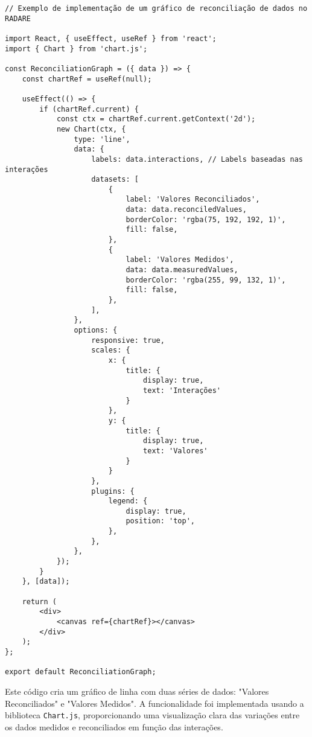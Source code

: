 \begin{verbatim}
// Exemplo de implementação de um gráfico de reconciliação de dados no RADARE

import React, { useEffect, useRef } from 'react';
import { Chart } from 'chart.js';

const ReconciliationGraph = ({ data }) => {
    const chartRef = useRef(null);

    useEffect(() => {
        if (chartRef.current) {
            const ctx = chartRef.current.getContext('2d');
            new Chart(ctx, {
                type: 'line',
                data: {
                    labels: data.interactions, // Labels baseadas nas interações
                    datasets: [
                        {
                            label: 'Valores Reconciliados',
                            data: data.reconciledValues,
                            borderColor: 'rgba(75, 192, 192, 1)',
                            fill: false,
                        },
                        {
                            label: 'Valores Medidos',
                            data: data.measuredValues,
                            borderColor: 'rgba(255, 99, 132, 1)',
                            fill: false,
                        },
                    ],
                },
                options: {
                    responsive: true,
                    scales: {
                        x: {
                            title: {
                                display: true,
                                text: 'Interações'
                            }
                        },
                        y: {
                            title: {
                                display: true,
                                text: 'Valores'
                            }
                        }
                    },
                    plugins: {
                        legend: {
                            display: true,
                            position: 'top',
                        },
                    },
                },
            });
        }
    }, [data]);

    return (
        <div>
            <canvas ref={chartRef}></canvas>
        </div>
    );
};

export default ReconciliationGraph;
\end{verbatim}

Este código cria um gráfico de linha com duas séries de dados: "Valores Reconciliados" e "Valores Medidos". A funcionalidade foi implementada usando a biblioteca \texttt{Chart.js}, proporcionando uma visualização clara das variações entre os dados medidos e reconciliados em função das interações.

